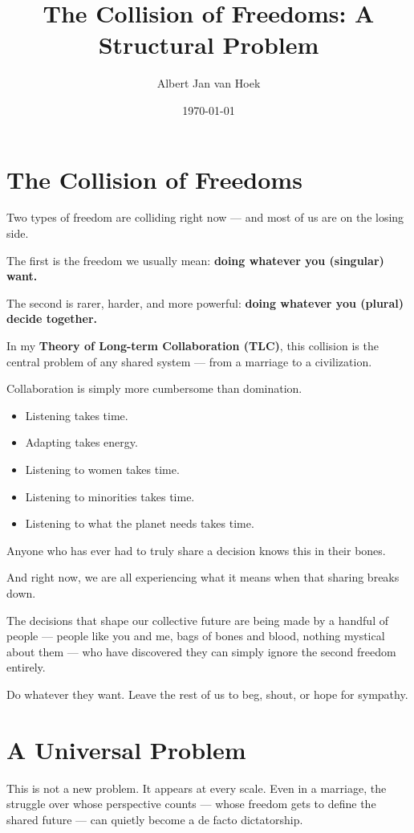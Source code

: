\documentclass{article}
\title{The Collision of Freedoms: A Structural Problem}
\author{Albert Jan van Hoek}
\date{\today}
\begin{document}
\maketitle

\section*{The Collision of Freedoms}

Two types of freedom are colliding right now — and most of us are on the losing side.

The first is the freedom we usually mean: \textbf{doing whatever you (singular) want.}

The second is rarer, harder, and more powerful: \textbf{doing whatever you (plural) decide together.}

In my \textbf{Theory of Long-term Collaboration (TLC)}, this collision is the central problem of any shared system — from a marriage to a civilization.

Collaboration is simply more cumbersome than domination.

\begin{itemize}
    \item Listening takes time.
    \item Adapting takes energy.
    \item Listening to women takes time.
    \item Listening to minorities takes time.
    \item Listening to what the planet needs takes time.
\end{itemize}

Anyone who has ever had to truly share a decision knows this in their bones.

And right now, we are all experiencing what it means when that sharing breaks down.

The decisions that shape our collective future are being made by a handful of people — people like you and me, bags of bones and blood, nothing mystical about them — who have discovered they can simply ignore the second freedom entirely.

Do whatever they want. Leave the rest of us to beg, shout, or hope for sympathy.

\section*{A Universal Problem}

This is not a new problem. It appears at every scale.
Even in a marriage, the struggle over whose perspective counts — whose freedom gets to define the shared future — can quietly become a de facto dictatorship.
\end{document}

